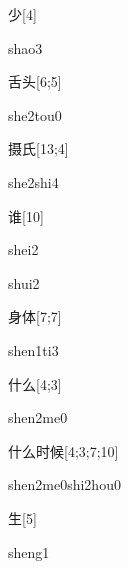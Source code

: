\begin{verbete}[shao3]{少}[4]
\begin{pronuncia}{shao3}
\end{pronuncia}
\end{verbete}

\begin{verbete}{舌头}[6;5]
\begin{pronuncia}{she2tou0}
\end{pronuncia}
\end{verbete}

\begin{verbete}{摄氏}[13;4]
\begin{pronuncia}{she2shi4}
\end{pronuncia}
\end{verbete}

\begin{verbete}[shei2]{谁}[10]
\begin{pronuncia}{shei2}
\end{pronuncia}
\begin{pronuncia}{shui2}
\end{pronuncia}
\end{verbete}

\begin{verbete}[shen1ti3]{身体}[7;7]
\begin{pronuncia}{shen1ti3}
\end{pronuncia}
\end{verbete}

\begin{verbete}[shen2me0]{什么}[4;3]
\begin{pronuncia}{shen2me0}
\end{pronuncia}
\end{verbete}

\begin{verbete}{什么时候}[4;3;7;10]
\begin{pronuncia}{shen2me0shi2hou0}
\end{pronuncia}
\end{verbete}

\begin{verbete}[sheng1]{生}[5]
\begin{pronuncia}{sheng1}
\end{pronuncia}
\end{verbete}


